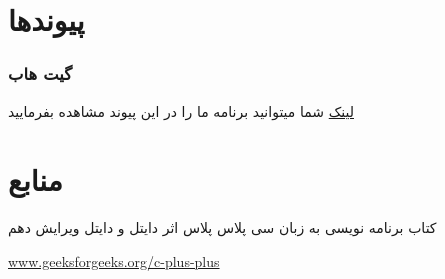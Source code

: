 \documentclass[pdf,titlepage,a4paper]{report}
\begin{document}
	\part{پیوندها}
	\section{گیت هاب}
	\href{https://github.com/Matin0789/Condottiere-.git}{لینک}
     شما میتوانید برنامه ما را در این پیوند مشاهده بفرمایید 
	\newpage
	
	
	
	\part{منابع}
	\begin{itemize}
		\item کتاب برنامه نویسی به زبان سی پلاس پلاس اثر دایتل و دایتل ویرایش دهم\\
	\begin{latin}
		\item \href{https://www.geeksforgeeks.org/c-plus-plus/}{www.geeksforgeeks.org/c-plus-plus}
	\end{latin}
	\end{itemize}
	
	
\end{document}
